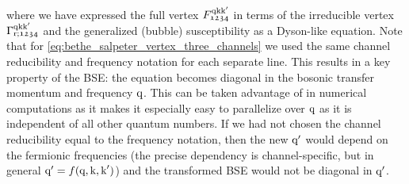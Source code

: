 \documentclass[../../main.tex]{subfiles}
\begin{document}
where we have expressed the full vertex $F_{\mathfrak{1234}}^{\text{q}\text{k}\text{k}'}$ in terms of the irreducible vertex $\Gamma_{\text{r};\mathfrak{1234}}^{\text{q}\text{k}\text{k}'}$ and the generalized (bubble) susceptibility as a Dyson-like equation. Note that for \eqref{eq:bethe_salpeter_vertex_three_channels} we used the same channel reducibility and frequency notation for each separate line. This results in a key property of the BSE: the equation becomes diagonal in the bosonic transfer momentum and frequency $\text{q}$. This can be taken advantage of in numerical computations as it makes it especially easy to parallelize over $\text{q}$ as it is independent of all other quantum numbers. If we had not chosen the channel reducibility equal to the frequency notation, then the new $\text{q}'$ would depend on the fermionic frequencies (the precise dependency is channel-specific, but in general $\text{q}'=f(\text{q},\text{k},\text{k}')$) and the transformed BSE would not be diagonal in $\text{q}'$. 
\end{document}
